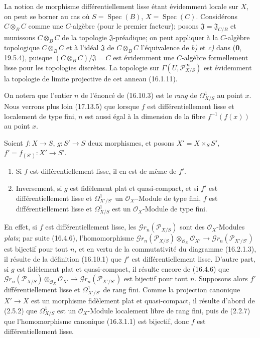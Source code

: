 La notion de morphisme différentiellement lisse étant évidemment locale sur
$X$, on peut se borner au cas où $S=\operatorname{Spec}(B)$,
$X=\operatorname{Spec}(C)$. Considérons $C\otimes_B C$ comme une $C$-algèbre
(pour le premier facteur); posons $\mathfrak{J}=\mathfrak{J}_{C/B}$ et
munissons $C\otimes_B C$ de la topologie $\mathfrak{J}$-préadique; on peut
appliquer à la $C$-algèbre topologique $C\otimes_B C$ et à l'idéal
$\mathfrak{J}$ de $C\otimes_B C$ l'équivalence de \emph{b)} et \emph{c)} dans (\textbf{0}, 19.5.4),
puisque $(C\otimes_B C)/\mathfrak{J}=C$ est évidemment une $C$-algèbre
formellement lisse pour les topologies discrètes. La topologie sur
$\Gamma(U,\mathscr{P}_{X/S}^{\infty})$ est évidemment la topologie de limite
projective de cet anneau (16.1.11).

On notera que l'entier $n$ de l'énoncé de (16.10.3) est le \emph{rang} de
$\varOmega_{X/S}^1$ au point $x$. Nous verrons plus loin (17.13.5) que lorsque
$f$ est différentiellement lisse et localement de type fini, $n$ est aussi
égal à la dimension de la fibre $f^{-1}(f(x))$ au point $x$.

\begin{proposition}[16.10.4]
\label{IV.16.10.4}
Soient $f:X\to S$, $g:S'\to S$ deux morphismes, et posons
$X'=X\times_S S'$, $f'=f_{(S')}:X'\to S'$.
\begin{enumerate}
  \item[\textup{(i)}] Si $f$ est différentiellement lisse, il en est de même de $f'$.
  \item[\textup{(ii)}] Inversement, si $g$ est fidèlement plat et quasi-compact, et si
  $f'$ est différentiellement lisse et $\varOmega_{X'/S'}^1$ un
  $\mathcal{O}_{X'}$-Module de type fini, $f$ est différentiellement lisse et
  $\varOmega_{X/S}^1$ est un $\mathcal{O}_X$-Module de type fini.
\end{enumerate}
\end{proposition}

En effet, si $f$ est différentiellement lisse, les
$\mathscr{G}r_n(\mathscr{P}_{X/S})$ sont des $\mathcal{O}_X$-Modules
\emph{plats}; par suite (16.4.6), l'homomorphisme
$\mathscr{G}r_n(\mathscr{P}_{X/S})\otimes_{\mathcal{O}_X}\mathcal{O}_{X'}\to\mathscr{G}r_n(\mathscr{P}_{X'/S'})$ est bijectif pour tout $n$, et en vertu de la commutativité du diagramme
(16.2.1.3), il résulte de la définition (16.10.1) que $f'$ est
différentiellement lisse. D'autre part, si $g$ est fidèlement plat et
quasi-compact, il résulte encore de (16.4.6) que
$\mathscr{G}r_n(\mathscr{P}_{X/S})\otimes_{\mathcal{O}_X}\mathcal{O}_{X'}\to\mathscr{G}r_n(\mathscr{P}_{X'/S'})$ est bijectif pour tout $n$. Supposons alors $f'$ différentiellement lisse et
$\varOmega_{X'/S'}^1$ de rang fini. Comme la projection canonique $X'\to X$ est
un morphisme fidèlement plat et quasi-compact, il résulte d'abord de (2.5.2)
que $\varOmega_{X/S}^1$ est un $\mathcal{O}_X$-Module localement libre de rang
fini, puis de (2.2.7) que l'homomorphisme canonique (16.3.1.1) est bijectif,
donc $f$ est différentiellement lisse.

